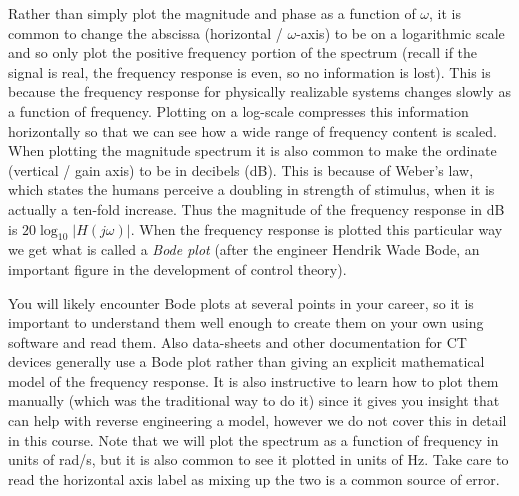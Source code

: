 Rather than simply plot the magnitude and phase as a function of $\omega$, it is common to change the abscissa (horizontal / $\omega$-axis) to be on a logarithmic scale and so only plot the positive frequency portion of the spectrum (recall if the signal is real, the frequency response is even, so no information is lost). This is because the frequency response for physically realizable systems changes slowly as a function of frequency. Plotting on a log-scale compresses this information horizontally so that we can see how a wide range of frequency content is scaled. When plotting the magnitude spectrum it is also common to make the ordinate (vertical / gain axis) to be in decibels (dB). This is because of Weber's law, which states the humans perceive a doubling in strength of stimulus, when it is actually a ten-fold increase. Thus the magnitude of the frequency response in dB is $20 \log_{10} |H(j\omega)|$. When the frequency response is plotted this particular way we get what is called a \textit{Bode plot} (after the engineer Hendrik Wade Bode, an important figure in the development of control theory).

You will likely encounter Bode plots at several points in your career, so it is important to understand them well enough to create them on your own using software and read them. Also data-sheets and other documentation for CT devices generally use a Bode plot rather than giving an explicit mathematical model of the frequency response. It is also instructive to learn how to plot them manually (which was the traditional way to do it) since it gives you insight that can help with reverse engineering a model, however we do not cover this in detail in this course. Note that we will plot the spectrum as a function of frequency in units of rad/s, but it is also common to see it plotted in units of Hz. Take care to read the horizontal axis label as mixing up the two is a common source of error.

